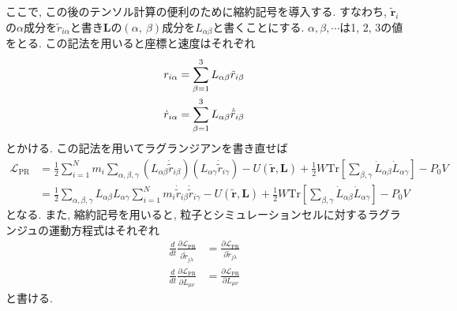 ここで, この後のテンソル計算の便利のために縮約記号を導入する.
すなわち, $\tilde{\bm{r}}_{i}$の$\alpha$成分を$\tilde{r}_{i\alpha}$と書き$\bm{L}$の$(\alpha,~\beta)$成分を$L_{\alpha \beta}$と書くことにする. 
$\alpha,\beta,\cdots$は1, 2, 3の値をとる. 
この記法を用いると座標と速度はそれぞれ
\begin{align}
  r_{i \alpha}
 &=
  \sum_{\beta = 1}^{3} L_{\alpha \beta} \tilde{r}_{i\beta}
  \\
  \notag
  \dot{r}_{i \alpha}
 &=
  \sum_{\beta = 1}^{3} L_{\alpha \beta} \dot{\tilde{r}}_{i\beta}
\end{align}
とかける. 
この記法を用いてラグランジアンを書き直せば
\begin{align}
  \mathcal{L}_{\mathrm{PR}}
 &=
  \frac{1}{2}
  \sum_{i=1}^{N} m_{i}
  \sum_{\alpha,\beta,\gamma}
  (L_{\alpha\beta}\dot{\tilde{r}}_{i\beta})
  (L_{\alpha\gamma}\dot{\tilde{r}}_{i\gamma})
  -
  U(\tilde{\bm{r}}, \bm{L})
  +
  \frac{1}{2} W
  \mathrm{Tr}
  \left[
    \sum_{\beta, \gamma}
    \dot{L}_{\alpha \beta} \dot{L}_{\alpha \gamma}
  \right]
  -
  P_{0} V
  \\
  &=
  \frac{1}{2}
  \sum_{\alpha,\beta,\gamma}
  L_{\alpha\beta} L_{\alpha\gamma}
  \sum_{i=1}^{N} m_{i}
  \dot{\tilde{r}}_{i\beta} \dot{\tilde{r}}_{i\gamma}
  -
  U(\tilde{\bm{r}}, \bm{L})
  +
  \frac{1}{2} W
  \mathrm{Tr}
  \left[
    \sum_{\beta, \gamma}
    \dot{L}_{\alpha \beta} \dot{L}_{\alpha \gamma}
  \right]
  -
  P_{0} V
\end{align}
となる. また, 縮約記号を用いると, 粒子とシミュレーションセルに対するラグランジュの運動方程式はそれぞれ
\begin{align}
  \frac{d}{dt}
  \frac{\partial \mathcal{L}_{\mathrm{PR}}}
  {\partial \dot{\tilde{r}}_{j \lambda}}
  \label{Eq:EoM-Lagrange-PR-particle2}
  &=
  \frac{\partial \mathcal{L}_{\mathrm{PR}}}{\partial \tilde{r}_{j \lambda}}
  \\
  \frac{d}{dt}
  \frac{\partial \mathcal{L}_{\mathrm{PR}}}
  {\partial \dot{L}_{\mu \nu}}
  &=
  \frac{\partial \mathcal{L}_{\mathrm{PR}}}{\partial L_{\mu \nu}}
  \label{Eq:EoM-Lagrange-PR-cell2}
\end{align}
と書ける.

